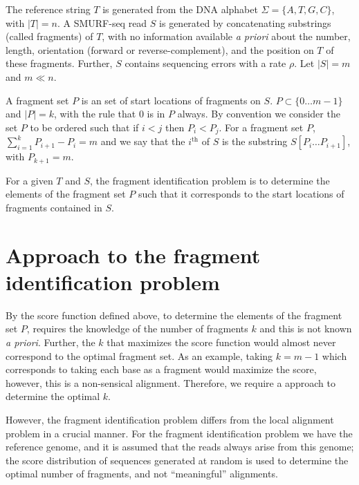 The reference string $T$ is generated from the DNA alphabet $\Sigma =
\{A, T, G, C\}$, with $|T| = n$.
A SMURF-seq read $S$ is generated by concatenating substrings (called
fragments) of $T$, with no information available \textit{a priori} about
the number, length, orientation (forward or reverse-complement), and the
position on $T$ of these fragments.  Further, $S$ contains sequencing
errors with a rate $\rho$. Let $|S| = m$ and $m \ll n$.

A fragment set $P$ is an set of start locations of fragments on $S$. $P
\subset \{0 \dots m-1\}$ and $|P| = k$, with the rule that $0$ is in $P$
always.
By convention we consider the set $P$ to be ordered such that if $i < j$
then $P_i < P_j$.
For a fragment set $P$, $\sum_{i = 1}^{k} P_{i+1} - P_i = m$ and we say
that the $i^{\text{th}}$ of $S$ is the substring $S[P_i \dots P_{i+1}]$,
with $P_{k+1} = m$.

For a given $T$ and $S$, the fragment identification problem is to
determine the elements of the fragment set $P$ such that it corresponds
to the start locations of fragments contained in $S$.



\section{Approach to the fragment identification problem}
By the score function defined above, to determine the elements of the
fragment set $P$, requires the knowledge of the number of fragments $k$
and this is not known \textit{a priori}. Further, the $k$ that maximizes
the score function would almost never correspond to the optimal fragment
set. As an example, taking $k=m-1$ which corresponds to taking each base
as a fragment would maximize the score, however, this is a non-sensical
alignment.
Therefore, we require a approach to determine the optimal $k$.

However, the fragment identification problem differs from the local
alignment problem in a crucial manner. For the fragment identification
problem we have the reference genome, and it is assumed that the reads
always arise from this genome; the score distribution of sequences
generated at random is used to determine the optimal number of
fragments, and not ``meaningful'' alignments.

